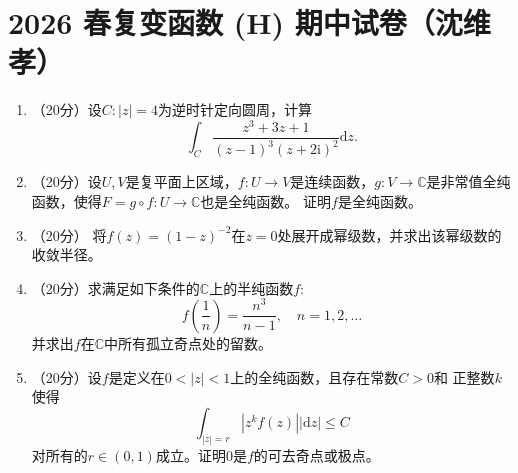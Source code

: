 \section*{2026 春复变函数 (H) 期中试卷（沈维孝）}
\begin{enumerate}
\item[一]（20分）设\(C : |z| = 4\)为逆时针定向圆周，计算
\[
    \int_C \frac{z^3 + 3z + 1}{(z - 1)^3(z + 2\mathrm{i})^2}\mathrm{d}z.
\]
\item[二]（20分）设\(U, V\)是复平面上区域，\(f : U \to V\)是连续函数，\(g : V \to
\mathbb{C}\)是非常值全纯函数，使得\(F = g \circ f : U \to \mathbb{C}\)也是全纯函数。
证明\(f\)是全纯函数。
\item[三]（20分）
将\(f(z) = (1 - z)^{-2}\)在\(z = 0\)处展开成幂级数，并求出该幂级数的收敛半径。
\item[四]（20分）求满足如下条件的\(\mathbb{C}\)上的半纯函数\(f\):
\[
    f\left( \frac{1}{n} \right) = \frac{n^3}{n-1},\quad n = 1, 2, \dots
\]
并求出\(f\)在\(\mathbb{C}\)中所有孤立奇点处的留数。
\item[五]（20分）设\(f\)是定义在\(0 < |z| < 1\)上的全纯函数，且存在常数\(C > 0\)和
正整数\(k\)使得
\[
    \int_{|z| = r}\left| z^k f(z) \right||\mathrm{d}z| \le C
\]
对所有的\(r \in (0, 1)\)成立。证明\(0\)是\(f\)的可去奇点或极点。
\end{enumerate}
